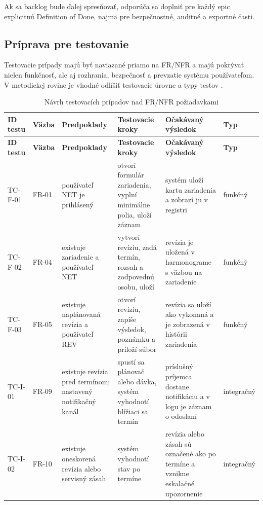 Ak sa backlog bude ďalej spresňovať, odporúča sa doplniť pre každý epic explicitnú Definition of Done, najmä pre bezpečnostné, auditné a exportné časti.

\subsection{Príprava pre testovanie}

Testovacie prípady majú byť naviazané priamo na FR/NFR a majú pokrývať nielen funkčnosť, ale aj rozhrania, bezpečnosť a prevzatie systému používateľom. V metodickej rovine je vhodné odlíšiť testovacie úrovne a typy testov \cite{ISTQBCTFL40}.

\begingroup
\footnotesize
\setlength{\tabcolsep}{2pt}
\begin{longtable}{|p{1.2cm}|p{1.8cm}|p{2.0cm}|p{3.2cm}|p{3.0cm}|p{1.3cm}|}
\caption{Návrh testovacích prípadov nad FR/NFR požiadavkami}\label{tab:test-cases-requirements}\\
\hline
\textbf{ID testu} & \textbf{Väzba} & \textbf{Predpoklady} & \textbf{Testovacie kroky} & \textbf{Očakávaný výsledok} & \textbf{Typ} \\
\hline
\endfirsthead
\hline
\textbf{ID testu} & \textbf{Väzba} & \textbf{Predpoklady} & \textbf{Testovacie kroky} & \textbf{Očakávaný výsledok} & \textbf{Typ} \\
\hline
\endhead
TC-F-01 & FR-01 & používateľ NET je prihlásený & otvorí formulár zariadenia, vyplní minimálne polia, uloží záznam & systém uloží kartu zariadenia a zobrazí ju v registri & funkčný \\
\hline
TC-F-02 & FR-04 & existuje zariadenie a používateľ NET & vytvorí revíziu, zadá termín, rozsah a zodpovednú osobu, uloží & revízia je uložená v harmonograme s väzbou na zariadenie & funkčný \\
\hline
TC-F-03 & FR-05 & existuje naplánovaná revízia a používateľ REV & otvorí revíziu, zapíše výsledok, poznámku a priloží súbor & revízia sa uloží ako vykonaná a je zobrazená v histórii zariadenia & funkčný \\
\hline
TC-I-01 & FR-09 & existuje revízia pred termínom; nastavený notifikačný kanál & spustí sa plánovač alebo dávka, systém vyhodnotí blížiaci sa termín & príslušný príjemca dostane notifikáciu a v logu je záznam o odoslaní & integračný \\
\hline
TC-I-02 & FR-10 & existuje oneskorená revízia alebo servisný zásah & systém vyhodnotí stav po termíne & revízia alebo zásah sú označené ako po termíne a vznikne eskalačné upozornenie & integračný \\

\end{longtable}
